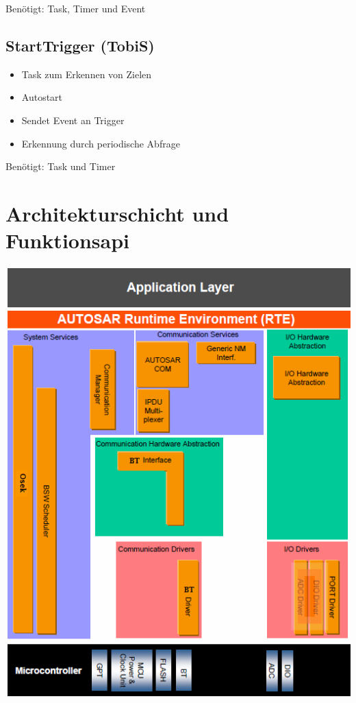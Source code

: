 \documentclass[a4paper,11pt]{scrreprt}
\begin{document}
Benötigt: Task, Timer und Event


\subsection*{StartTrigger (TobiS)}

\begin{itemize}
 \item Task zum Erkennen von Zielen
 \item Autostart
 \item Sendet Event an Trigger
 \item Erkennung durch periodische Abfrage
\end{itemize}

Benötigt: Task und Timer

\section{Architekturschicht und Funktionsapi}

\includegraphics{Komponenten.png}
\end{document}
